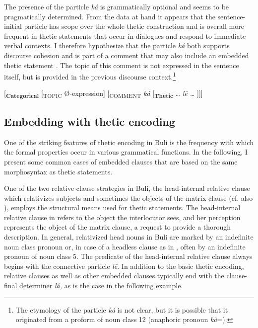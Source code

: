 \documentclass[output=paper]{langsci/langscibook}
\begin{document}
The presence of the particle \textit{ká} is grammatically optional and seems to be pragmatically determined. From the data at hand it appears that the sentence-initial particle has scope over the whole thetic construction and is overall more frequent in thetic statements that occur in dialogues and respond to immediate verbal contexts. I therefore hypothesize that the particle \textit{ká} both supports discourse cohesion and is part of a comment that may also include an embedded thetic statement . The topic of this comment is not expressed in the sentence itself, but is provided in the previous discourse context.\footnote{The etymology of the particle \textit{ká} is not clear, but it is possible that it originated from a proform of noun class 12 (anaphoric pronoun \textit{kà}=).} 

\ea
{  [\textbf{\textsubscript{Categorical}}\textsubscript{} [\textsubscript{TOPIC} Ø-expression]\textsubscript{} [\textsubscript{COMMENT}\textit{ ká} [\textbf{\textsubscript{Thetic}} … \textit{l\={e} …} ]]]}
\z

\subsection{Embedding with thetic encoding}\label{sec:schwarz:3.5}

One of the striking features of thetic encoding in Buli is the frequency with which the formal properties occur in various grammatical functions. In the following, I present some common cases of embedded clauses that are based on the same morphosyntax as thetic statements.

One of the two relative clause strategies in Buli, the head-internal relative clause which relativizes subjects and sometimes the objects of the matrix clause (cf. also \citealt{Hiraiwa2003}), employs the structural means used for thetic statements. The head-internal relative clause in  refers to the object the interlocutor sees, and her perception represents the object of the matrix clause, a request to provide a thorough description. In general, relativized head nouns in Buli are marked by an indefinite noun class pronoun or, in case of a headless clause as in , often by an indefinite pronoun of noun class 5. The predicate of the head-internal relative clause always begins with the connective particle \textit{l\={e}}. In addition to the basic thetic encoding, relative clauses as well as other embedded clauses typically end with the clause-final determiner \textit{lá,} as is the case in the following example.
\end{document}
